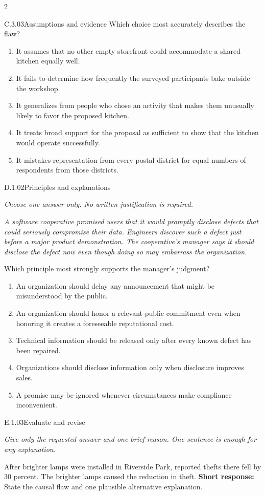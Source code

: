 \documentclass[9pt]{extarticle}
\newcommand{\choice}[1]{\item #1}
\begin{document}
\begin{multicols}{2}
\begin{DenseCoreProblem}{C.3.03}{Assumptions and evidence}
Which choice most accurately describes the flaw?
\begin{enumerate}[label=(\alph*)]
  \choice{It assumes that no other empty storefront could accommodate a shared kitchen equally well.}
  \choice{It fails to determine how frequently the surveyed participants bake outside the workshop.}
  \choice{It generalizes from people who chose an activity that makes them unusually likely to favor the proposed kitchen.}
  \choice{It treats broad support for the proposal as sufficient to show that the kitchen would operate successfully.}
  \choice{It mistakes representation from every postal district for equal numbers of respondents from those districts.}
\end{enumerate}
\end{DenseCoreProblem}
\begin{DenseCoreProblem}{D.1.02}{Principles and explanations}
{\scriptsize\textit{Choose one answer only. No written justification is required.}\par}
\emph{A software cooperative promised users that it would promptly disclose defects that could seriously compromise their data. Engineers discover such a defect just before a major product demonstration. The cooperative's manager says it should disclose the defect now even though doing so may embarrass the organization.}

Which principle most strongly supports the manager's judgment?
\begin{enumerate}[label=(\alph*)]
  \choice{An organization should delay any announcement that might be misunderstood by the public.}
  \choice{An organization should honor a relevant public commitment even when honoring it creates a foreseeable reputational cost.}
  \choice{Technical information should be released only after every known defect has been repaired.}
  \choice{Organizations should disclose information only when disclosure improves sales.}
  \choice{A promise may be ignored whenever circumstances make compliance inconvenient.}
\end{enumerate}
\end{DenseCoreProblem}
\begin{DenseCoreProblem}{E.1.03}{Evaluate and revise}
{\scriptsize\textit{Give only the requested answer and one brief reason. One sentence is enough for any explanation.}\par}
After brighter lamps were installed in Riverside Park, reported thefts there fell by 30 percent. The brighter lamps caused the reduction in theft.
\textbf{Short response:} State the causal flaw and one plausible alternative explanation.
\end{DenseCoreProblem}
\end{multicols}
\end{document}
